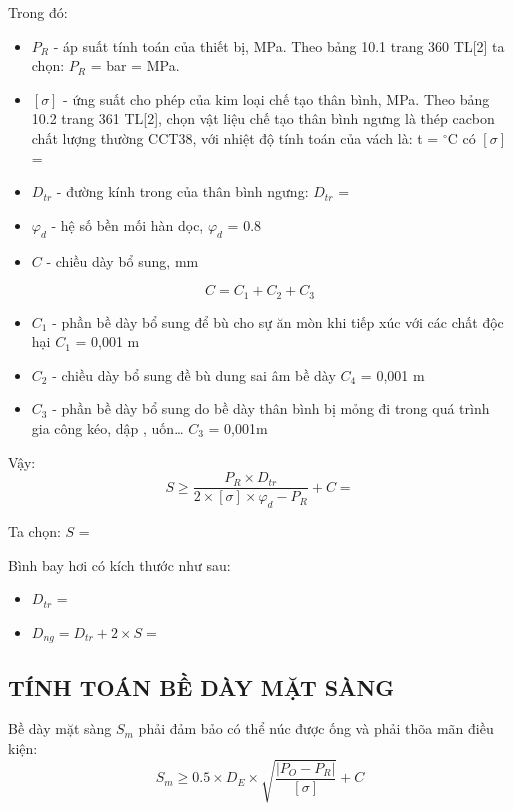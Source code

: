 Trong đó:
\begin{itemize}
	\item $P_{R}$ - áp suất tính toán của thiết bị, MPa. Theo bảng 10.1 trang 360 TL[2] ta chọn: $P_{R}$ =  bar =  MPa.
	\item $[\sigma]$ - ứng suất cho phép của kim loại chế tạo thân bình, MPa. Theo bảng 10.2 trang 361 TL[2], chọn vật liệu chế tạo thân bình ngưng là thép cacbon chất lượng thường CCT38, với nhiệt độ tính toán của vách là: t = $^{\circ}$C có $[\sigma]$ = 
	\item $D_{tr}$ - đường kính trong của thân bình ngưng: $D_{tr}$ = 
	\item $\varphi_{d}$ - hệ số bền mối hàn dọc, $\varphi_{d}$ = 0.8
	\item $C$ - chiều dày bổ sung, mm
\end{itemize}
\begin{equation*}
	C = C_{1} + C_{2} + C_{3}
\end{equation*}
\begin{itemize}[label={$\star$}]
	\item $C_{1}$ - phần bề dày bổ sung để bù cho sự ăn mòn khi tiếp xúc với các	chất độc hại $C_{1}$ = 0,001 m
	\item $C_{2}$ - chiều dày bổ sung đề bù dung sai âm bề dày $C_{4}$ = 0,001 m
	\item $C_{3}$ - phần bề dày bổ sung do bề dày thân bình bị mỏng đi trong quá trình gia công kéo, dập , uốn… $C_{3}$ = 0,001m
\end{itemize}

Vậy:
\begin{equation*}
	S \geq \dfrac{P_{R}\times D_{tr}}{2\times [\sigma]\times\varphi_{d} - P_{R}} + C = 
\end{equation*}

Ta chọn: $S$ =

Bình bay hơi có kích thước như sau:
\begin{itemize}[label={$\diamond$}]
	\item $D_{tr}$ = 
	\item $D_{ng} = D_{tr} + 2\times S = $ 
\end{itemize}

\subsection{TÍNH TOÁN BỀ DÀY MẶT SÀNG}
Bề dày mặt sàng $S_{m}$ phải đảm bảo có thể núc được ống và phải thõa mãn điều kiện:
\begin{equation*}
	S_{m} \geq 0.5\times D_{E}\times \sqrt{\dfrac{|P_{O} - P_{R}|}{[\sigma]}} + C
\end{equation*}

